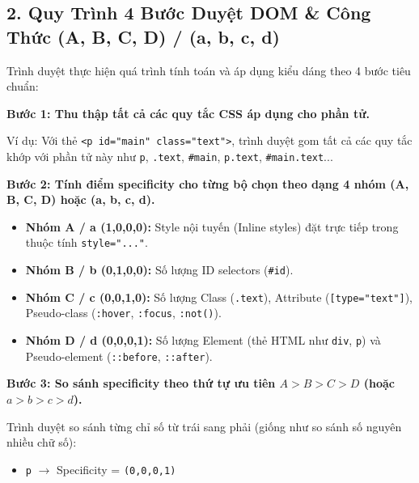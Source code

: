 \documentclass[11pt,oneside]{book}
\newcommand{\codeinline}[1]{\textcolor{accentOrange}{\texttt{#1}}}
\begin{document}
\subsection{2. Quy Trình 4 Bước Duyệt DOM \& Công Thức (A, B, C, D) / (a, b, c, d)}

Trình duyệt thực hiện quá trình tính toán và áp dụng kiểu dáng theo 4 bước tiêu chuẩn:

\begin{conceptBox}
\textbf{Bước 1: Thu thập tất cả các quy tắc CSS áp dụng cho phần tử.} \par
Ví dụ: Với thẻ \codeinline{<p id="main" class="text">}, trình duyệt gom tất cả các quy tắc khớp với phần tử này như \codeinline{p}, \codeinline{.text}, \codeinline{\#main}, \codeinline{p.text}, \codeinline{\#main.text}...
\par\vspace{4pt}
\textbf{Bước 2: Tính điểm specificity cho từng bộ chọn theo dạng 4 nhóm (A, B, C, D) hoặc (a, b, c, d).}
\begin{itemize}[leftmargin=1.5em, itemsep=2pt, parsep=0pt]
    \item \textbf{Nhóm A / a (1,0,0,0):} Style nội tuyến (Inline styles) đặt trực tiếp trong thuộc tính \codeinline{style="..."}.
    \item \textbf{Nhóm B / b (0,1,0,0):} Số lượng ID selectors (\codeinline{\#id}).
    \item \textbf{Nhóm C / c (0,0,1,0):} Số lượng Class (\codeinline{.text}), Attribute (\codeinline{[type="text"]}), Pseudo-class (\codeinline{:hover}, \codeinline{:focus}, \codeinline{:not()}).
    \item \textbf{Nhóm D / d (0,0,0,1):} Số lượng Element (thẻ HTML như \codeinline{div}, \codeinline{p}) và Pseudo-element (\codeinline{::before}, \codeinline{::after}).
\end{itemize}
\par\vspace{4pt}
\textbf{Bước 3: So sánh specificity theo thứ tự ưu tiên $A > B > C > D$ (hoặc $a > b > c > d$).} \par
Trình duyệt so sánh từng chỉ số từ trái sang phải (giống như so sánh số nguyên nhiều chữ số):
\begin{itemize}[leftmargin=1.5em, itemsep=2pt, parsep=0pt]
    \item \codeinline{p} $\rightarrow$ Specificity = \codeinline{(0,0,0,1)}

\end{itemize}
\end{conceptBox}
\end{document}
